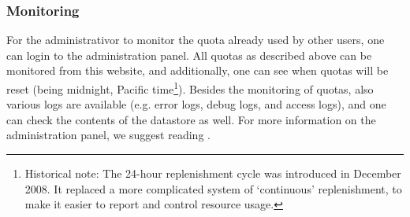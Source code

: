 \subsubsection{Monitoring}
For the administrativor to monitor the quota already used by other users, one can
login to the administration panel. All quotas as described above can be monitored
from this website, and additionally, one can see when quotas will be reset (being
midnight, Pacific time\footnote{Historical note: The 24-hour replenishment cycle
was introduced in December 2008. It replaced a more complicated system of
`continuous' replenishment, to make it easier to report and control resource
usage.}).  Besides the monitoring of quotas, also various logs are available
(e.g. error logs, debug logs, and access logs), and one can check the contents of
the datastore as well. For more information on the administration panel, we
suggest reading \cite{app-engine-admin}.

